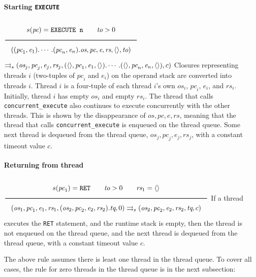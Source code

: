 \paragraph{Starting \texttt{EXECUTE}}
\label{sec:org6246ae4}
\(\\\Rule{s(\textit{pc}) = \texttt{EXECUTE n} \qquad \textit{to} > 0}{((\textit{pc}_1, \textit{e}_1). \cdots .(\textit{pc}_n, \textit{e}_n).\textit{os}, \textit{pc}, \textit{e}, \textit{rs}, \langle \rangle, \textit{to})}\\\)
\(\rightrightarrows_s (\textit{os}_j, \textit{pc}_j, \textit{e}_j, \textit{rs}_j, (\langle \rangle, \textit{pc}_1, \textit{e}_1, \langle \rangle). \cdots .(\langle \rangle, \textit{pc}_n, \textit{e}_n, \langle \rangle), c)\\\)
Closures representing threads \(i\) (two-tuples of \(\textit{pc}_i\) and \(\textit{e}_i\)) on the operand stack are converted into threads \(i\). Thread \(i\) is a four-tuple of each thread \(i\)'s own \(\textit{os}_i\), \(\textit{pc}_i\), \(\textit{e}_i\), and \(\textit{rs}_i\). Initially, thread \(i\) has empty \(\textit{os}_i\) and empty \(\textit{rs}_i\).
The thread that calls \texttt{concurrent\_execute} also continues to execute concurrently with the other threads. This is shown by the disappearance of \(\textit{os}, \textit{pc}, \textit{e}, \textit{rs}\), meaning that the thread that calls \texttt{concurrent\_execute} is enqueued on the thread queue.
Some next thread is dequeued from the thread queue, \(\textit{os}_j, \textit{pc}_j, \textit{e}_j, \textit{rs}_j\), with a constant timeout value \(c\).

\paragraph{Returning from thread}
\label{sec:orgb558241}
\(\\\Rule{s(\textit{pc}_1) = \texttt{RET} \qquad \textit{to} > 0 \qquad \textit{rs}_1 = \langle \rangle}{(\textit{os}_1, \textit{pc}_1, \textit{e}_1, \textit{rs}_1, (\textit{os}_2, \textit{pc}_2, \textit{e}_2, \textit{rs}_2).\textit{tq}, 0) \transition (\textit{os}_2, \textit{pc}_2, \textit{e}_2, \textit{rs}_2, \textit{tq}, c)}\\\)
If a thread executes the \texttt{RET} statement, and the runtime stack is empty, then the thread is not enqueued on the thread queue, and the next thread is dequeued from the thread queue, with a constant timeout value \(c\).

The above rule assumes there is least one thread in the thread queue. To cover all cases, the rule for zero threads in the thread queue is in the next subsection:


